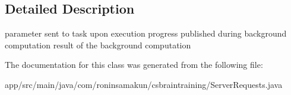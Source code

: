 \subsection{Detailed Description}
parameter sent to task upon execution progress published during background computation result of the background computation 

The documentation for this class was generated from the following file\+:\begin{DoxyCompactItemize}
\item 
app/src/main/java/com/roninsamakun/csbraintraining/Server\+Requests.\+java\end{DoxyCompactItemize}

